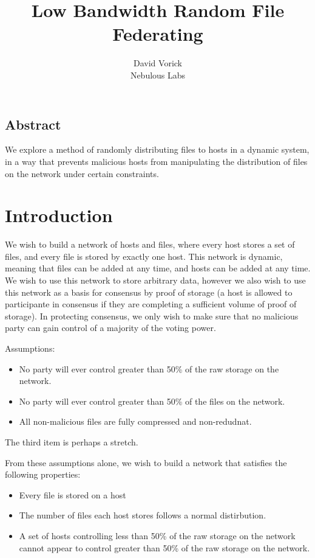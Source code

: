 \documentclass[twocolumn]{article}
\begin{document}
\frenchspacing

\title{Low Bandwidth Random File Federating}

\author{
{\rm David Vorick}\\
Nebulous Labs
}

\maketitle

\subsection*{Abstract}
We explore a method of randomly distributing files to hosts in a dynamic system, in a way that prevents malicious hosts from manipulating the distribution of files on the network under certain constraints.

\section{Introduction}
We wish to build a network of hosts and files, where every host stores a set of files, and every file is stored by exactly one host.
This network is dynamic, meaning that files can be added at any time, and hosts can be added at any time.
We wish to use this network to store arbitrary data, however we also wish to use this network as a basis for consensus by proof of storage (a host is allowed to participante in consensus if they are completing a sufficient volume of proof of storage).
In protecting consensus, we only wish to make sure that no malicious party can gain control of a majority of the voting power.

Assumptions:
\begin{itemize}
	\item No party will ever control greater than 50\% of the raw storage on the network.
	\item No party will ever control greater than 50\% of the files on the network.
	\item All non-malicious files are fully compressed and non-redudnat.
\end{itemize}
The third item is perhaps a stretch.

From these assumptions alone, we wish to build a network that satisfies the following properties:
\begin{itemize}
	\item Every file is stored on a host
	\item The number of files each host stores follows a normal distirbution.
	\item A set of hosts controlling less than 50\% of the raw storage on the network cannot appear to control greater than 50\% of the raw storage on the network.
\end{itemize}
\end{document}
